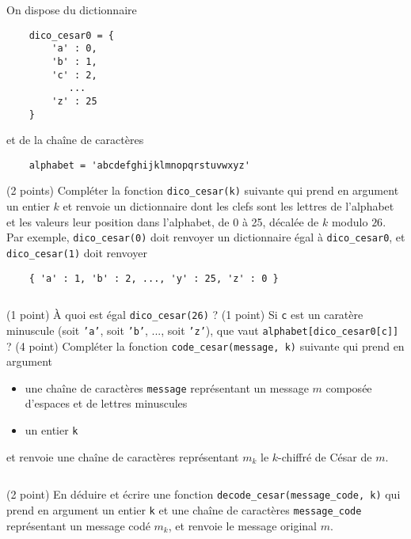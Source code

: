 On dispose du dictionnaire 
\begin{verbatim}
    dico_cesar0 = {
        'a' : 0,
        'b' : 1,
        'c' : 2,
           ...
        'z' : 25
    }
\end{verbatim}
et de la chaîne de caractères
\begin{verbatim}
    alphabet = 'abcdefghijklmnopqrstuvwxyz'
\end{verbatim}
\quessques (2 points) Compléter la fonction \texttt{dico_cesar(k)} suivante qui prend en argument un entier $ k $ et renvoie un dictionnaire dont les clefs sont les lettres de l'alphabet et les valeurs leur position dans l'alphabet, de 0 à 25, décalée de $ k $ modulo $ 26 $. Par exemple, \texttt{dico_cesar(0)} doit renvoyer un dictionnaire égal à \texttt{dico_cesar0}, et \texttt{dico_cesar(1)} doit renvoyer
\begin{verbatim}
    { 'a' : 1, 'b' : 2, ..., 'y' : 25, 'z' : 0 }
\end{verbatim}
\inputminted{python}{minted/exams/dico_cesar.py}
\ssques (1 point) À quoi est égal \texttt{dico_cesar(26)} ?
\quessques (1 point) Si \texttt{c} est un caratère minuscule (soit \texttt{'a'}, soit \texttt{'b'}, ..., soit \texttt{'z'}), que vaut \texttt{alphabet[dico_cesar0[c]]} ?
\ssques (4 point) Compléter la fonction \texttt{code_cesar(message, k)} suivante qui prend en argument
\begin{itemize}[label=$ \bullet $]
    \item une chaîne de caractères \texttt{message} représentant un message $ m $ composée d'espaces et de lettres minuscules
    \item un entier \texttt{k}
\end{itemize}
et renvoie une chaîne de caractères représentant $ m_k $ le $ k $-chiffré de César de $ m $.
\inputminted{python}{minted/exams/code_cesar.py}
\ssques (2 point) En déduire et écrire une fonction \texttt{decode_cesar(message_code, k)} qui prend en argument un entier \texttt{k} et une chaîne de caractères \texttt{message\_code} représentant un message codé $ m_k $, et renvoie le message original $ m $.\\


